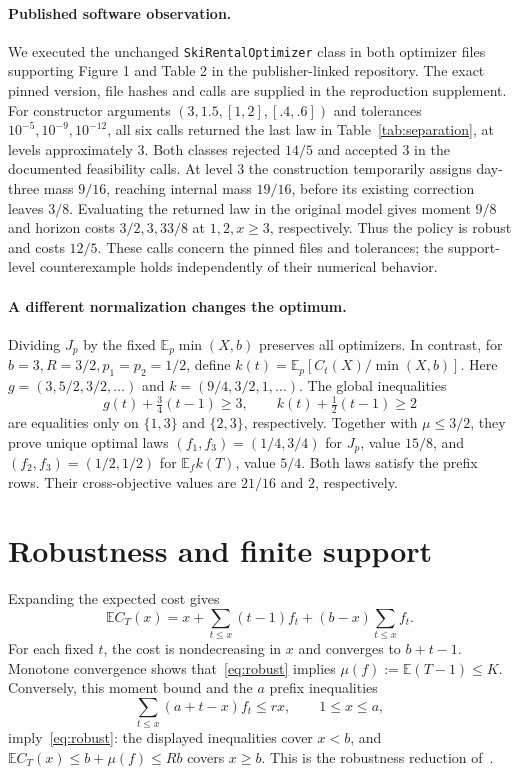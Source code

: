 \documentclass[manuscript,11pt,screen,nonacm]{acmart}
\newcommand{\E}{\mathbb E}
\begin{document}
\paragraph{Published software observation.}
We executed the unchanged \texttt{SkiRentalOptimizer} class in both
optimizer files supporting Figure 1 and Table 2 in the publisher-linked
repository. The exact pinned version, file hashes and calls are supplied
in the reproduction supplement.
For constructor arguments $(3,1.5,[1,2],[.4,.6])$ and tolerances
$10^{-5},10^{-9},10^{-12}$, all six calls returned the last law in
Table~\ref{tab:separation}, at levels approximately 3. Both classes rejected
$14/5$ and accepted 3 in the documented feasibility calls. At level 3 the
construction temporarily assigns day-three mass $9/16$, reaching internal
mass $19/16$, before its existing correction leaves $3/8$. Evaluating the
returned law in the original model gives moment $9/8$ and horizon costs
$3/2,3,33/8$ at $1,2,x\ge3$, respectively. Thus the policy is robust and
costs $12/5$. These calls concern the pinned files and tolerances; the
support-level counterexample holds independently of their numerical behavior.

\paragraph{A different normalization changes the optimum.}
Dividing $J_p$ by the fixed $\E_p\min(X,b)$ preserves all optimizers.
In contrast, for $b=3,R=3/2,p_1=p_2=1/2$, define
$k(t)=\E_p[C_t(X)/\min(X,b)]$. Here
$g=(3,5/2,3/2,\ldots)$ and $k=(9/4,3/2,1,\ldots)$.
The global inequalities
\[
 g(t)+\tfrac34(t-1)\ge3,\qquad
 k(t)+\tfrac12(t-1)\ge2
\]
are equalities only on $\{1,3\}$ and $\{2,3\}$, respectively.
Together with $\mu\le3/2$, they prove unique optimal laws
$(f_1,f_3)=(1/4,3/4)$ for $J_p$, value $15/8$, and
$(f_2,f_3)=(1/2,1/2)$ for $\E_f k(T)$, value $5/4$.
Both laws satisfy the prefix rows. Their cross-objective values are
$21/16$ and $2$, respectively.

\section{Robustness and finite support}\label{sec:reduction}
Expanding the expected cost gives
\[
 \E C_T(x)=x+\sum_{t\le x}(t-1)f_t+(b-x)\sum_{t\le x}f_t.
\]
For each fixed $t$, the cost is nondecreasing in $x$ and converges to
$b+t-1$. Monotone convergence shows that~\eqref{eq:robust} implies
$\mu(f):=\E(T-1)\le K$. Conversely, this moment bound and the $a$ prefix
inequalities
\begin{equation}\label{eq:prefix}
 \sum_{t\le x}(a+t-x)f_t\le rx,\qquad 1\le x\le a,
\end{equation}
imply~\eqref{eq:robust}: the displayed inequalities cover $x<b$, and
$\E C_T(x)\le b+\mu(f)\le Rb$ covers $x\ge b$.
This is the robustness reduction of~\cite[Lemma 5.1]{pmlr-v306-kim26l}.
\end{document}
